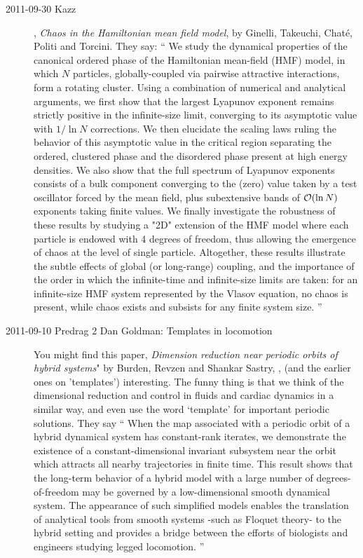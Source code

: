 \begin{description}
\item[2011-09-30 Kazz] ,
\emph{Chaos in the Hamiltonian mean field model},
by  Ginelli, Takeuchi, Chat\'e, Politi and Torcini.
They say:
``
 We study the dynamical properties of the canonical ordered phase of the
Hamiltonian mean-field (HMF) model, in which $N$ particles, globally-coupled
via pairwise attractive interactions, form a rotating cluster. Using a
combination of numerical and analytical arguments, we first show that the
largest Lyapunov exponent remains strictly positive in the infinite-size limit,
converging to its asymptotic value with $1/\ln N$ corrections. We then
elucidate the scaling laws ruling the behavior of this asymptotic value in the
critical region separating the ordered, clustered phase and the disordered
phase present at high energy densities. We also show that the full spectrum of
Lyapunov exponents consists of a bulk component converging to the (zero) value
taken by a test oscillator forced by the mean field, plus subextensive bands of
${\cal O}(\ln N)$ exponents taking finite values. We finally investigate the
robustness of these results by studying a "2D" extension of the HMF model where
each particle is endowed with 4 degrees of freedom, thus allowing the emergence
of chaos at the level of single particle. Altogether, these results illustrate
the subtle effects of global (or long-range) coupling, and the importance of
the order in which the infinite-time and infinite-size limits are taken: for an
infinite-size HMF system represented by the Vlasov equation, no chaos is
present, while chaos exists and subsists for any finite system size.
''


\item[2011-09-10 Predrag 2 Dan Goldman: Templates in locomotion]
You might find this paper,
\emph{Dimension reduction near periodic orbits of hybrid systems}"
by Burden, Revzen and Shankar Sastry, ,
(and the earlier ones on 'templates')
interesting. The funny thing is that we think of the dimensional
reduction and control in fluids and cardiac dynamics in a similar way,
and even use the word `template' for important periodic solutions.
They say
``
When the {\Poincare} map associated with a periodic orbit of a hybrid
dynamical system has constant-rank iterates, we demonstrate the existence of a
constant-dimensional invariant subsystem near the orbit which attracts all
nearby trajectories in finite time. This result shows that the long-term
behavior of a hybrid model with a large number of degrees-of-freedom may be
governed by a low-dimensional smooth dynamical system. The appearance of such
simplified models enables the translation of analytical tools from smooth
systems -such as Floquet theory- to the hybrid setting and provides a bridge
between the efforts of biologists and engineers studying legged locomotion.
''


\end{description}
